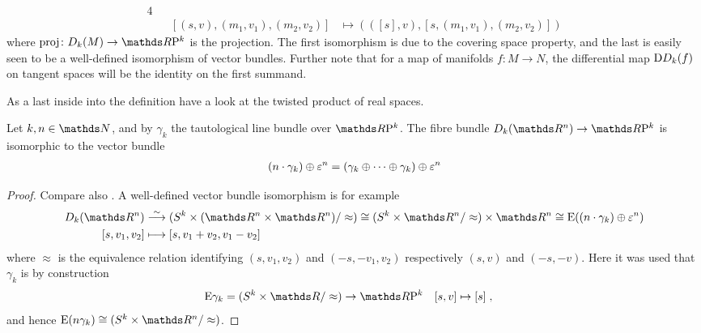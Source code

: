 \begin{Rem}
\begin{enumerate}
\begin{enumerate}
\begin{alignat*}{4}
        \\
        &&[(s,v), (m_1,v_1), (m_2,v_2)]
        &\longmapsto
        \left( ([s], v), [s, (m_1,v_1), (m_2, v_2)] \right)
      \end{alignat*}
      where $\proj\colon\Twistedprod{k}{M}\to\RP k$ is the projection.
      The first isomorphism is due to the covering space property, and
      the last is easily seen to be a well-defined isomorphism of
      vector bundles.
      Further note that for a map of manifolds $f\colon M\to N$,
      the differential map $\mathrm{D}D_{k}({f})$ on tangent spaces
      will be the identity on the first summand.
    \end{enumerate}
  \end{enumerate}
\end{Rem}

As a last inside into the definition have a look at the twisted
product of real spaces.
\begin{Lem}\label{lem:twistedprodrealspace}
  Let $k, n\in\Nat$,
  and by $\gamma_k$ the tautological line bundle over
  $\RP k$.
  The fibre bundle $\Twistedprod{k}{\R^n}\to \RP k$ is isomorphic to
  the vector bundle
  \begin{gather*}
    (n\cdot\gamma_k)\oplus\varepsilon^n
    = (\gamma_k\oplus\dotsb\oplus\gamma_k)\oplus\varepsilon^n
  \end{gather*}
  \begin{proof}
    Compare also \cite[Prop.~4.3,p~1107]{brown}.
    A well-defined vector bundle isomorphism is for example
    \begin{align*}
      \Twistedprod{k}{\R^n}
      &\overset{\sim}\longto
        (\Twistedprodcovspace{k}{\R^n}/\approx)
        \cong (\Sphere{k}\times\R^n/\approx)\times\R^n
        \cong \E{((n\cdot\gamma_k)\oplus\trivbdl^n)}
      \\
      [s, v_1, v_2]
      &\longmapsto
        [s, v_1+v_2, v_1-v_2]
    \end{align*}
    where $\approx$ is the equivalence relation identifying
    $(s,v_1,v_2)$ and $(-s,-v_1,v_2)$ respectively $(s,v)$ and
    $(-s,-v)$.
    Here it was used that $\gamma_k$ is by
    construction
    \begin{align*}
      \E{\gamma_k} = (\Sphere k\times\R/\approx) &\to \RP k
      &[s,v] &\mapsto [s]
               \;,
    \end{align*}
    and hence
    $\E{(n\gamma_k)}\cong(\Sphere k \times\R^n/\approx)$.
  \end{proof}
\end{Lem}

